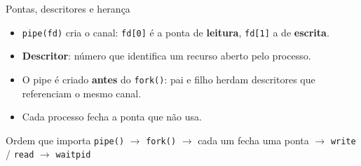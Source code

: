 \documentclass[aspectratio=169]{beamer}
\begin{document}
\begin{frame}{Pontas, descritores e herança}
\begin{itemize}
    \item \texttt{pipe(fd)} cria o canal: \texttt{fd[0]} é a ponta de \textbf{leitura}, \texttt{fd[1]} a de \textbf{escrita}.
    \item \textbf{Descritor}: número que identifica um recurso aberto pelo processo.
    \item O pipe é criado \textbf{antes} do \texttt{fork()}: pai e filho herdam descritores que referenciam o mesmo canal.
    \item Cada processo fecha a ponta que não usa.
\end{itemize}

\vspace{0.6em}
\begin{alertblock}{Ordem que importa}
\texttt{pipe()} $\rightarrow$ \texttt{fork()} $\rightarrow$ cada um fecha uma ponta $\rightarrow$ \texttt{write} / \texttt{read} $\rightarrow$ \texttt{waitpid}
\end{alertblock}
\end{frame}
\end{document}
